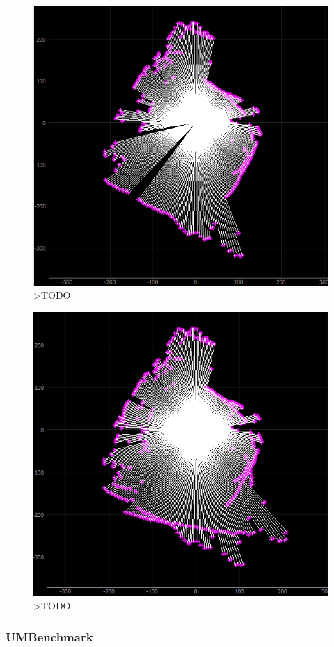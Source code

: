 \begin{figure}[ht]
	\centering
		\includegraphics[width=0.5\linewidth]{rys/ScanBot-12-calibrated-room-map3.PNG}
	\caption{>TODO}
	\label{fig:xxx}
\end{figure}

\begin{figure}[ht]
	\centering
		\includegraphics[width=0.5\linewidth]{rys/ScanBot-12-calibrated-room-map4.PNG}
	\caption{>TODO}
	\label{fig:xxx}
\end{figure}


\subsubsection{UMBenchmark\cite{Borenstein1995}}



